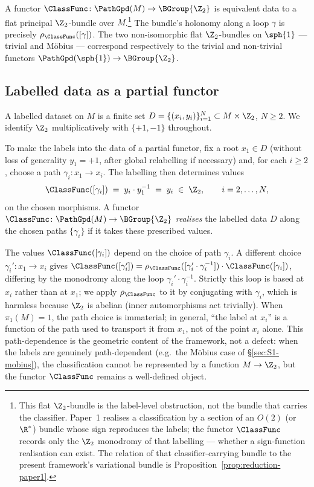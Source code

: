 \begin{remark}\label{rem:flat-bundle}
A functor $\ClassFunc\colon\PathGpd(M)\to\BGroup{\Z_2}$ is equivalent
data to a flat principal $\Z_2$-bundle over $M$.\footnote{This flat
$\Z_2$-bundle is the label-level obstruction, not the bundle that
carries the classifier. Paper~1 \cite{Vasii2026Paper1} realises a
classification by a section of an $O(2)$ (or $\R^*$) bundle whose
sign reproduces the labels; the functor $\ClassFunc$ records only the
$\Z_2$ monodromy of that labelling --- whether a sign-function
realisation can exist. The relation of that classifier-carrying
bundle to the present framework's variational bundle is
Proposition~\ref{prop:reduction-paper1}.} The bundle's holonomy
along a loop $\gamma$ is precisely $\rho_{\ClassFunc}([\gamma])$. The
two non-isomorphic flat $\Z_2$-bundles on $\sph{1}$ --- trivial and
M\"obius --- correspond respectively to the trivial and non-trivial
functors $\PathGpd(\sph{1})\to\BGroup{\Z_2}$.
\end{remark}

\subsection{Labelled data as a partial functor}\label{ssec:data-as-functor}

A labelled dataset on $M$ is a finite set
$D=\{(x_i,y_i)\}_{i=1}^N\subset M\times\Z_2$, $N\geq 2$. We identify
$\Z_2$ multiplicatively with $\{+1,-1\}$ throughout.

To make the labels into the data of a partial functor, fix a root
$x_1\in D$ (without loss of generality $y_1=+1$, after global relabelling
if necessary) and, for each $i\geq 2$, choose a path
$\gamma_i\colon x_1\to x_i$. The labelling then determines values
\[
   \ClassFunc([\gamma_i]) \;=\; y_i\cdot y_1^{-1} \;=\; y_i \;\in\;\Z_2,
   \qquad i=2,\dots,N,
\]
on the chosen morphisms. A functor $\ClassFunc\colon\PathGpd(M)\to
\BGroup{\Z_2}$ \emph{realises} the labelled data $D$ along the chosen
paths $\{\gamma_i\}$ if it takes these prescribed values.

\begin{remark}\label{rem:path-dependence}
The values $\ClassFunc([\gamma_i])$ depend on the choice of path
$\gamma_i$. A different choice $\gamma_i'\colon x_1\to x_i$ gives
$\ClassFunc([\gamma_i'])=\rho_{\ClassFunc}([\gamma_i'\cdot\gamma_i^{-1}])
\cdot\ClassFunc([\gamma_i])$, differing by the monodromy along the
loop $\gamma_i'\cdot\gamma_i^{-1}$. Strictly this loop is based at
$x_i$ rather than at $x_1$; we apply $\rho_{\ClassFunc}$ to it by
conjugating with $\gamma_i$, which is harmless because $\Z_2$ is
abelian (inner automorphisms act trivially). When $\pi_1(M)=1$, the
path choice is immaterial; in general, ``the label at $x_i$'' is a
function of the path used to transport it from $x_1$, not of the
point $x_i$ alone. This path-dependence is the geometric content of
the framework, not a defect: when the labels are genuinely
path-dependent (e.g.\ the M\"obius case of \S\ref{sec:S1-mobius}),
the classification cannot be represented by a function $M\to\Z_2$,
but the functor $\ClassFunc$ remains a well-defined object.
\end{remark}


